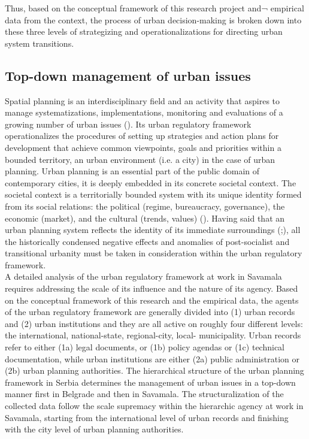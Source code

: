 \documentclass[11pt]{report}
\begin{document}
Thus, based on the conceptual framework of this research project and¬ empirical data from the context, the process of urban decision-making is broken down into these three levels of strategizing and operationalizations for directing urban system transitions. 

\subsection{Top-down management of urban issues}

Spatial planning is an interdisciplinary field and an activity that aspires to manage systematizations, implementations, monitoring and evaluations of a growing number of urban issues (\href{Fisher}{\citealt{fisher_building_2001}}). Its urban regulatory framework operationalizes the procedures of setting up strategies and action plans for development that achieve common viewpoints, goals and priorities within a bounded territory, an urban environment (i.e. a city) in the case of urban planning.
Urban planning is an essential part of the public domain of contemporary cities, it is deeply embedded in its concrete societal context. The societal context is a territorially bounded system with its unique identity formed from its social relations: the political (regime, bureaucracy, governance), the economic (market), and the cultural  (trends, values)  (\href{Vujosevic}{\citealt{vujosevic_planning_2006}}).
Having said that an urban planning system reflects the identity of its immediate surroundings (\href{Stojkov}{\citealt{stojkov_prostorno_2012}};\href{}{\citealt{faliRef}}),
 all the historically condensed negative effects and anomalies of post-socialist and transitional urbanity must be taken in consideration within the urban regulatory framework.
\\

A detailed analysis of the urban regulatory framework at work in Savamala requires addressing the scale of its influence and the nature of its agency. Based on the conceptual framework of this research and the empirical data, the agents of the urban regulatory framework are generally divided into (1) urban records and (2) urban institutions and they are all active on roughly four different levels: the international, national-state, regional-city, local- municipality. Urban records refer to either (1a) legal documents, or (1b) policy agendas or (1c) technical documentation, while urban institutions are either (2a) public administration or (2b) urban planning authorities. The hierarchical structure of the urban planning framework in Serbia determines the management of urban issues in a top-down manner first in Belgrade and then in Savamala. The structuralization of the collected data follow the scale supremacy within the hierarchic agency at work in Savamala, starting from the international level of urban records and finishing with the city level of urban planning authorities.
\\
\end{document}
